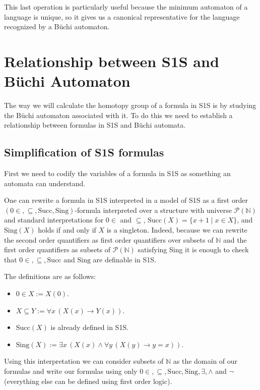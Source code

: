 \documentclass[11pt]{article}
\theoremstyle{definition}
\theoremstyle{remark}
\begin{document}
This last operation is particularly useful because the minimum automaton of a language is unique, so it gives us a canonical representative for the language recognized by a Büchi automaton.

\section{Relationship between S1S and Büchi Automaton}

The way we will calculate the homotopy group of a formula in S1S is by studying the Büchi automaton associated with it. To do this we need to establish a relationship between formulas in S1S and Büchi automata.

\subsection{Simplification of S1S formulas}

First we need to codify the variables of a formula in S1S as something an automata can understand.

One can rewrite a formula in S1S interpreted in a model of S1S as a first order $(0\in,\subseteq,\text{Succ},\text{Sing})$-formula interpreted over a structure with universe $\mathcal{P}(\mathbb{N})$ and standard interpretations for $0\in$ and $\subseteq$, $\text{Succ}(X)=\{ x+1 \mid x \in X \}$, and $\text{Sing}(X)$ holds if and only if $X$ is a singleton. Indeed, because we can rewrite the second order quantifiers as first order quantifiers over subsets of $\mathbb{N}$ and the first order quantifiers as subsets of $\mathcal{P}(\mathbb{N})$ satisfying Sing it is enough to check that $0\in,\subseteq,\text{Succ}$ and $\text{Sing}$ are definable in S1S.

The definitions are as follows:
\begin{itemize}[leftmargin=1.5em]
  \item $0 \in X := X(0)$.
  \item $X \subseteq Y := \forall x\, (X(x) \rightarrow Y(x))$.
  \item $\text{Succ}(X)$ is already defined in S1S.
  \item $\text{Sing}(X) := \exists x\, (X(x) \land \forall y\, (X(y) \rightarrow y=x))$.
\end{itemize}

Using this interpretation we can consider subsets of $\mathbb{N}$ as the domain of our formulas and write our formulas using only $0\in,\subseteq,\text{Succ},\text{Sing}, \exists, \land$ and $\lnot$ (everything else can be defined using first order logic).
\end{document}
